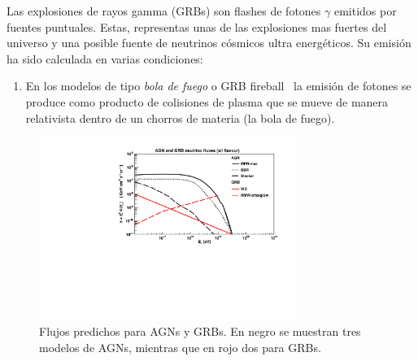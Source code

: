 	Las explosiones de rayos gamma (GRBs) son flashes de fotones $\gamma$ emitidos por fuentes puntuales.
	Estas, representas unas de las explosiones mas fuertes del universo y una posible fuente de neutrinos c\'osmicos ultra energ\'eticos.
	Su emisi\'on ha sido calculada en varias condiciones:
	\begin{enumerate}
	 \item En los modelos de tipo \emph{bola de fuego} o GRB fireball~\cite{cite:grb_Waxman1,cite:grb_Waxman2} la emisi\'on de fotones se produce como producto de colisiones de plasma que se mueve de manera relativista dentro de un chorros de materia (la bola de fuego). 
	\end{enumerate}
	
	\begin{figure}[ht]
		\begin{center}
		\includegraphics[width=0.75\textwidth]{fig/introduccion/AGN_GRB_nufluxes}
		\caption{\label{fig:flujosAGN} Flujos predichos para AGNs y GRBs. En negro se muestran tres modelos de AGNs\cite{cite:Mannheim1,cite:BBR,cite:SteckerAGN}, mientras que en rojo dos para GRBs\cite{cite:grb_Waxman2,cite:grb_Supernova}.}
		\end{center}
	\end{figure}
	
% 	



